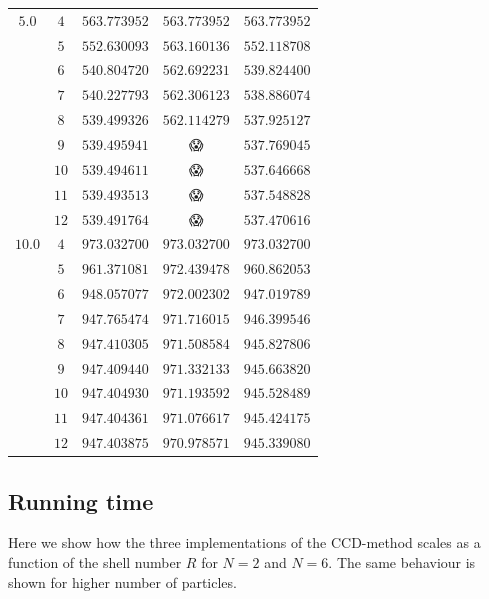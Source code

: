\documentclass[
    a4paper, aps, twocolumn, floatfix, superscriptaddress,
    nofootinbib]{revtex4-1}
\newcommand{\nan}{\DejaSans 😱}
\newcommand{\1}{\mathds{1}}
\begin{document}
\begin{table}
\begin{ruledtabular}
\begin{tabular}{c|c|ccc}
                    \hline
                    $5.0$ & $4$ & $563.773952$ & $563.773952$ & $563.773952$ \\
                          & $5$ & $552.630093$ & $563.160136$ & $552.118708$ \\
                          & $6$ & $540.804720$ & $562.692231$ & $539.824400$ \\
                          & $7$ & $540.227793$ & $562.306123$ & $538.886074$ \\
                          & $8$ & $539.499326$ & $562.114279$ & $537.925127$ \\
                          & $9$ & $539.495941$ & \nan & $537.769045$ \\
                          & $10$ & $539.494611$ & \nan & $537.646668$ \\
                          & $11$ & $539.493513$ & \nan & $537.548828$ \\
                          & $12$ & $539.491764$ & \nan & $537.470616$ \\
                    \hline
                    $10.0$ & $4$ & $973.032700$ & $973.032700$ & $973.032700$ \\
                           & $5$ & $961.371081$ & $972.439478$ & $960.862053$ \\
                           & $6$ & $948.057077$ & $972.002302$ & $947.019789$ \\
                           & $7$ & $947.765474$ & $971.716015$ & $946.399546$ \\
                           & $8$ & $947.410305$ & $971.508584$ & $945.827806$ \\
                           & $9$ & $947.409440$ & $971.332133$ & $945.663820$ \\
                           & $10$ & $947.404930$ & $971.193592$ & $945.528489$ \\
                           & $11$ & $947.404361$ & $971.076617$ & $945.424175$ \\
                           & $12$ & $947.403875$ & $970.978571$ & $945.339080$ \\
                \end{tabular}
            \end{ruledtabular}
            \label{tab:N20}
        \end{table}

    \subsection{Running time}
        Here we show how the three implementations of the CCD-method scales as a
        function of the shell number $R$ for $N = 2$ and $N = 6$. The same
        behaviour is shown for higher number of particles.
\end{document}
